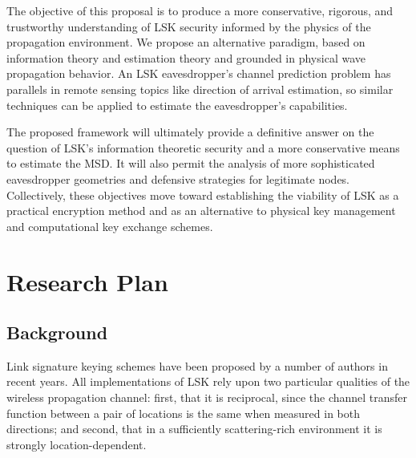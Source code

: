 \documentclass[12pt, titlepage]{article}
\begin{document}
The objective of this proposal is to produce a more conservative, rigorous, and trustworthy understanding of LSK security informed by the physics of the propagation environment.  We propose an alternative paradigm, based on information theory and estimation theory and grounded in physical wave propagation behavior.  An LSK eavesdropper's channel prediction problem has parallels in remote sensing topics like direction of arrival estimation, so similar techniques can be applied to estimate the eavesdropper's capabilities.  

The proposed framework will ultimately provide
%
a definitive answer on the question of LSK's information theoretic security 
%
and a more conservative means to estimate the MSD.  It will also 
%
permit the analysis of more sophisticated eavesdropper geometries and 
%
defensive strategies for legitimate nodes.  Collectively, these objectives 
%
move toward establishing the viability of LSK as a practical encryption method and as an alternative to physical key management and computational key exchange schemes.

\section*{Research Plan}
\subsection*{Background}
Link signature keying schemes have been proposed by a number of authors in recent years.  All implementations of LSK rely upon two particular qualities of the wireless propagation channel: first, that it is reciprocal, since the channel transfer function between a pair of locations is the same when measured in both directions; and second, that in a sufficiently scattering-rich environment it is strongly location-dependent. 
\end{document}
